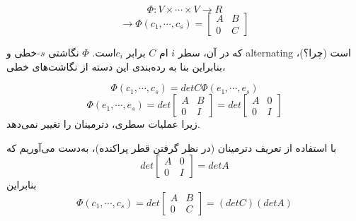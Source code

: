 $$ \Phi: V\times \cdots \times V \to R$$
$$ \to \Phi(c_1,\cdots, c_s) = \begin{bmatrix}
A & B \\
0 & C
\end{bmatrix} $$

که در آن، سطر $i$ ام $C$ برابر $c_i$است. $\Phi$ نگاشتی $s$-خطی و alternating است (چرا؟)، بنابراین بنا به رده‌بندی این دسته از نگاشت‌های خطی،

$$ \Phi(c_1,\cdots, c_s) = det C \Phi(e_1,\cdots, e_s) $$
$$ \Phi(e_1,\cdots, e_s) = det \begin{bmatrix}
A & B \\
0 & I
\end{bmatrix}= det \begin{bmatrix}
A & 0 \\
0 & I
\end{bmatrix} $$
زیرا عملیات سطری، دترمینان را تغییر نمی‌دهد.

با استفاده از تعریف دترمینان (در نظر گرفتن قطر پراکنده)، به‌دست می‌آوریم که
$$det \begin{bmatrix}
A & 0 \\
0 & I
\end{bmatrix} = det A $$
بنابراین
$$ \Phi(c_1,\cdots,c_s) = det \begin{bmatrix}
A & B \\
0 & C
\end{bmatrix} = (detC)(detA) $$

